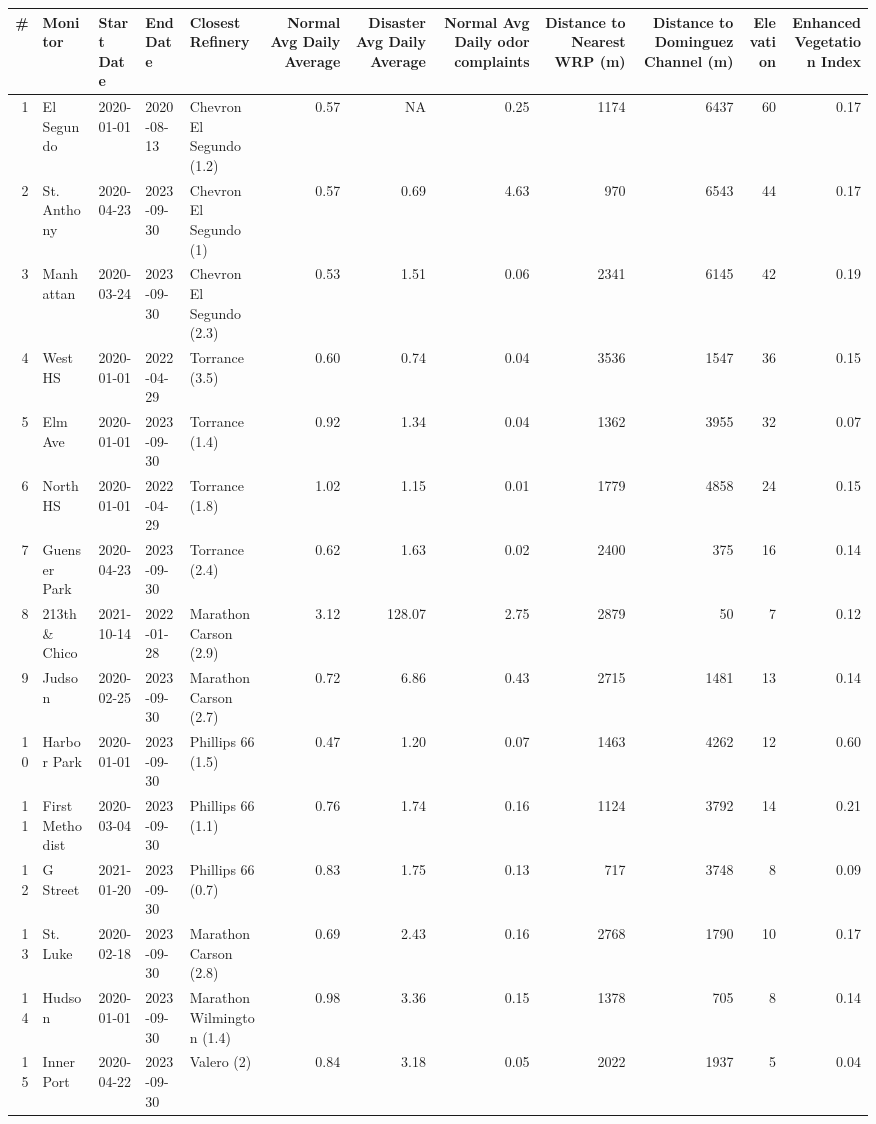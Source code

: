 
\begin{tabular}{r|l|l|l|l|r|r|r|r|r|r|r}
\hline
\# & Monitor & Start Date & End Date & Closest Refinery & Normal Avg Daily Average & Disaster Avg Daily Average & Normal Avg Daily odor complaints & Distance to Nearest WRP (m) & Distance to Dominguez Channel (m) & Elevation & Enhanced Vegetation Index\\
\hline
1 & El Segundo & 2020-01-01 & 2020-08-13 & Chevron El Segundo (1.2) & 0.57 & NA & 0.25 & 1174 & 6437 & 60 & 0.17\\
\hline
2 & St. Anthony & 2020-04-23 & 2023-09-30 & Chevron El Segundo (1) & 0.57 & 0.69 & 4.63 & 970 & 6543 & 44 & 0.17\\
\hline
3 & Manhattan & 2020-03-24 & 2023-09-30 & Chevron El Segundo (2.3) & 0.53 & 1.51 & 0.06 & 2341 & 6145 & 42 & 0.19\\
\hline
4 & West HS & 2020-01-01 & 2022-04-29 & Torrance (3.5) & 0.60 & 0.74 & 0.04 & 3536 & 1547 & 36 & 0.15\\
\hline
5 & Elm Ave & 2020-01-01 & 2023-09-30 & Torrance (1.4) & 0.92 & 1.34 & 0.04 & 1362 & 3955 & 32 & 0.07\\
\hline
6 & North HS & 2020-01-01 & 2022-04-29 & Torrance (1.8) & 1.02 & 1.15 & 0.01 & 1779 & 4858 & 24 & 0.15\\
\hline
7 & Guenser Park & 2020-04-23 & 2023-09-30 & Torrance (2.4) & 0.62 & 1.63 & 0.02 & 2400 & 375 & 16 & 0.14\\
\hline
8 & 213th \& Chico & 2021-10-14 & 2022-01-28 & Marathon Carson (2.9) & 3.12 & 128.07 & 2.75 & 2879 & 50 & 7 & 0.12\\
\hline
9 & Judson & 2020-02-25 & 2023-09-30 & Marathon Carson (2.7) & 0.72 & 6.86 & 0.43 & 2715 & 1481 & 13 & 0.14\\
\hline
10 & Harbor Park & 2020-01-01 & 2023-09-30 & Phillips 66 (1.5) & 0.47 & 1.20 & 0.07 & 1463 & 4262 & 12 & 0.60\\
\hline
11 & First Methodist & 2020-03-04 & 2023-09-30 & Phillips 66 (1.1) & 0.76 & 1.74 & 0.16 & 1124 & 3792 & 14 & 0.21\\
\hline
12 & G Street & 2021-01-20 & 2023-09-30 & Phillips 66 (0.7) & 0.83 & 1.75 & 0.13 & 717 & 3748 & 8 & 0.09\\
\hline
13 & St. Luke & 2020-02-18 & 2023-09-30 & Marathon Carson (2.8) & 0.69 & 2.43 & 0.16 & 2768 & 1790 & 10 & 0.17\\
\hline
14 & Hudson & 2020-01-01 & 2023-09-30 & Marathon Wilmington (1.4) & 0.98 & 3.36 & 0.15 & 1378 & 705 & 8 & 0.14\\
\hline
15 & Inner Port & 2020-04-22 & 2023-09-30 & Valero (2) & 0.84 & 3.18 & 0.05 & 2022 & 1937 & 5 & 0.04\\
\hline
\end{tabular}
